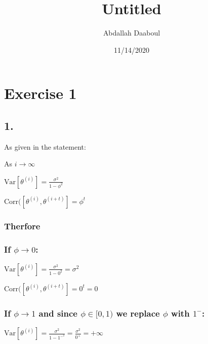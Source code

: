 \documentclass[
]{article}
\title{Untitled}
\author{Abdallah Daaboul}
\date{11/14/2020}
\begin{document}
\maketitle

\hypertarget{exercise-1}{%
\section{Exercise 1}\label{exercise-1}}

\hypertarget{section}{%
\subsection{1.}\label{section}}

As given in the statement:

As \(i \rightarrow \infty\)

\(\text{Var}[\theta^{(i)}] = \frac{\sigma^2}{1-\phi^2}\)

\(\text{Corr}([\theta^{(i)},\theta^{(i+t)}] = \phi^t\)

\hypertarget{therfore}{%
\subsubsection{Therfore}\label{therfore}}

\hypertarget{if-phi-rightarrow-0}{%
\subsubsection{\texorpdfstring{If
\(\phi \rightarrow 0\):}{If \textbackslash phi \textbackslash rightarrow 0:}}\label{if-phi-rightarrow-0}}

\(\text{Var}[\theta^{(i)}] = \frac{\sigma^2}{1-0^2} = \sigma^2\)

\(\text{Corr}([\theta^{(i)},\theta^{(i+t)}] = 0^t = 0\)

\hypertarget{if-phi-rightarrow-1-and-since-phiin01-we-replace-phi-with-1-}{%
\subsubsection{\texorpdfstring{If \(\phi \rightarrow 1\) and since
\(\phi\in[0,1)\) we replace \(\phi\) with
\(1^-\):}{If \textbackslash phi \textbackslash rightarrow 1 and since \textbackslash phi\textbackslash in{[}0,1) we replace \textbackslash phi with 1\^{}-:}}\label{if-phi-rightarrow-1-and-since-phiin01-we-replace-phi-with-1-}}

\(\text{Var}[\theta^{(i)}] = \frac{\sigma^2}{1-1^{-^2}} = \frac{\sigma^2}{0^+} = +\infty\)
\end{document}
